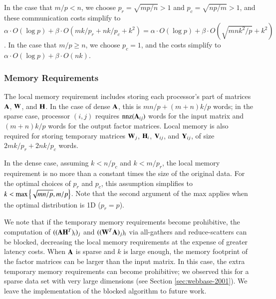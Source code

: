 In the case that $m/p<n$, we choose $p_r=\sqrt{mp/n} >1$ and $p_c=\sqrt{np/m}>1$, and these communication costs simplify to $\alpha \cdot O(\log p) + \beta \cdot O(mk/p_r+nk/p_c+k^2) = \alpha \cdot O(\log p) + \beta \cdot O(\sqrt{mnk^2/p}+k^2)$.
In the case that $m/p\geq n$, we choose $p_c=1$, and the costs simplify to $\alpha \cdot O(\log p) + \beta \cdot O(nk)$.


\subsubsection{Memory Requirements}
\label{sec:new_memory}

The local memory requirement includes storing each processor's part of matrices $\AA$, $\WW$, and $\HH$.
In the case of dense $\AA$, this is $mn/p+(m+n)k/p$ words; in the sparse case, processor $(i,j)$ requires $\nnz(\AA_{ij})$ words for the input matrix and $(m+n)k/p$ words for the output factor matrices.
Local memory is also required for storing temporary matrices $\WW_j$, $\HH_i$, $\M{V}_{ij}$, and $\M{Y}_{ij}$, of size $2mk/p_r+2nk/p_c$ words.

In the dense case, assuming $k<n/p_c$ and $k<m/p_r$, the local memory requirement is no more than a constant times the size of the original data.
For the optimal choices of $p_r$ and $p_c$, this assumption simplifies to $k<\max\lt\{\sqrt{mn/p},m/p\rt\}$. 
Note that the second argument of the max applies when the optimal distribution is 1D ($p_r=p$).

We note that if the temporary memory requirements become prohibitive, the computation of $((\AA \HH^T)_i)_j$ and $((\WW^T\AA)_j)_i$ via all-gathers and reduce-scatters can be blocked, decreasing the local memory requirements at the expense of greater latency costs.
When $\AA$ is sparse and $k$ is large enough, the memory footprint of the factor matrices can be larger than the input matrix.
In this case, the extra temporary memory requirements can become prohibitive; we observed this for a sparse data set with very large dimensions (see Section \ref{sec:webbase-2001}).
We leave the implementation of the blocked algorithm to future work.


